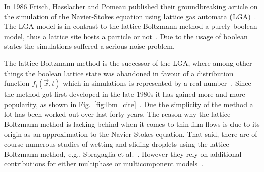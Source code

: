In 1986 Frisch, Hasslacher and Pomeau published their groundbreaking article on the simulation of the Navier-Stokes equation using lattice gas automata (LGA)~\cite{frischLatticeGasAutomataNavierStokes1986}.
The LGA model is in contrast to the lattice Boltzmann method a purely boolean model, thus a lattice site hosts a particle or not~\cite{mcnamaraUseBoltzmannEquation1988}.
Due to the usage of boolean states the simulations suffered a serious noise problem.

The lattice Boltzmann method is the successor of the LGA, where among other things the boolean lattice state was abandoned in favour of a distribution function $f_{i}(\vec{x}, t)$ which in simulations is represented by a real number~\cite{chenLatticeBoltzmannMethod1998}. 
Since the method got first developed in the late 1980s it has gained more and more popularity, as shown in Fig.~\ref{fig:lbm_cite}~\cite{liLatticeBoltzmannMethod2020}.
Due the simplicity of the method a lot has been worked out over last forty years.
The reason why the lattice Boltzmann method is lacking behind when it comes to thin film flows is due to its origin as an approximation to the Navier-Stokes equation.
That said, there are of course numerous studies of wetting and sliding droplets using the lattice Boltzmann method, e.g., Sbragaglia et al.~\cite{sbragagliaSlidingDropsAlternating2014}.
However they rely on additional contributions for either multiphase or multicomponent models~\cite{shanLatticeBoltzmannModel1993, chenLatticeMethodsTheir1995, shanKineticTheoryRepresentation2006}.

